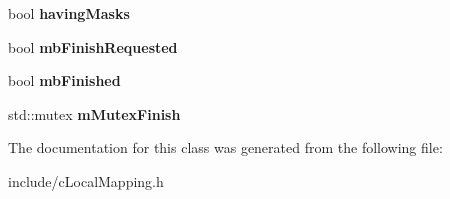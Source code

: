 \begin{DoxyCompactItemize}
\item 
bool {\bfseries having\+Masks}\hypertarget{classMultiColSLAM_1_1cLocalMapping_a51115504cf7e8dcd711d267895271c24}{}\label{classMultiColSLAM_1_1cLocalMapping_a51115504cf7e8dcd711d267895271c24}

\item 
bool {\bfseries mb\+Finish\+Requested}\hypertarget{classMultiColSLAM_1_1cLocalMapping_aa1cc30eefefc7dadc362a3eca22419f4}{}\label{classMultiColSLAM_1_1cLocalMapping_aa1cc30eefefc7dadc362a3eca22419f4}

\item 
bool {\bfseries mb\+Finished}\hypertarget{classMultiColSLAM_1_1cLocalMapping_a1c60cff11a14be823e10309c735fda1d}{}\label{classMultiColSLAM_1_1cLocalMapping_a1c60cff11a14be823e10309c735fda1d}

\item 
std\+::mutex {\bfseries m\+Mutex\+Finish}\hypertarget{classMultiColSLAM_1_1cLocalMapping_afc804625dc324238a8b1439aa2735e87}{}\label{classMultiColSLAM_1_1cLocalMapping_afc804625dc324238a8b1439aa2735e87}

\end{DoxyCompactItemize}


The documentation for this class was generated from the following file\+:\begin{DoxyCompactItemize}
\item 
include/c\+Local\+Mapping.\+h\end{DoxyCompactItemize}
